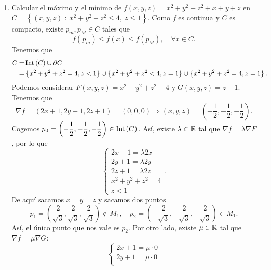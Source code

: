 \begin{eg}
\begin{enumerate}
\[f\left(p_{1}\right)=2\sqrt{5}, \quad f\left(p_{2}\right) = -2\sqrt{5}, \quad f\left(p_{3}\right) = -6, \quad f\left(p_{4}\right)=-6 .\]
Por tanto, el mínimo se alcanza en $\displaystyle p_{3} $ y $\displaystyle p_{4} $ y el máximo se alcanza en $\displaystyle p_{1} $. 
\item Calcular el máximo y el mínimo de $\displaystyle f\left(x,y,z\right) = x^{2} +y^{2} +z^{2} +x + y + z $ en $\displaystyle C = \left\{ \left(x,y,z\right) \; : \; x^{2} +y^{2} + z^{2} \leq 4, \; z \leq 1\right\}  $. Como $\displaystyle f $ es continua y $\displaystyle C $ es compacto, existe $\displaystyle p_{m}, p_{M} \in C $ tales que 
	\[f\left(p_{m}\right) \leq f\left(x\right) \leq f\left(p_{M}\right), \quad \forall x \in C .\]
Tenemos que 
\[
\begin{split}
	C = & \operatorname{Int}\left(C\right) \cup \partial C \\
	= &  \left\{x^{2}+y^{2}+z^{2} = 4 , z < 1\right\} \cup \left\{ x^{2}+y^{2}+z^{2} < 4,  z = 1\right\}  \cup \left\{ x^{2} +y^{2}+z^{2} = 4, z = 1\right\} .
\end{split}
\]
Podemos considerar $\displaystyle F\left(x,y,z\right)=x^{2}+y^{2}+z^{2}-4 $ y $\displaystyle G\left(x,y,z\right) = z-1 $. Tenemos que 
\[\nabla f = \left(2x+1, 2y+1, 2z+1\right) = \left(0,0,0\right) \Rightarrow \left(x,y,z\right) = \left(-\frac{1}{2}, -\frac{1}{2}, -\frac{1}{2}\right) .\]
Cogemos $\displaystyle p_{0} = \left(-\frac{1}{2}, -\frac{1}{2}, -\frac{1}{2}\right) \in \operatorname{Int}\left(C\right) $. Así, existe $\displaystyle \lambda \in \mathbb{R} $ tal que $\displaystyle \nabla f = \lambda \nabla F $, por lo que 
\[
\begin{cases}
2x+1 = \lambda 2x \\
2y+1 = \lambda 2y \\
2z+1 = \lambda 2z \\
x^{2}+y^{2}+z^{2} = 4 \\
z < 1
\end{cases}
.\]
De aquí sacamos $\displaystyle x = y = z $ y sacamos dos puntos
\[p_{1} = \left(\frac{2}{\sqrt{3}}, \frac{2}{\sqrt{3}}, \frac{2}{\sqrt{3}}\right) \not\in M_{1}, \quad p_{2} = \left(-\frac{2}{\sqrt{3}}, -\frac{2}{\sqrt{3}}, -\frac{2}{\sqrt{3}}\right) \in M_{1}.\]
Así, el único punto que nos vale es $\displaystyle p_{2} $. Por otro lado, existe $\displaystyle \mu \in \mathbb{R} $ tal que $\displaystyle \nabla f = \mu \nabla G $:
\[
\begin{cases}
2x+1 = \mu \cdot 0 \\
2y+1 = \mu \cdot 0 \\

\end{cases}\]
\end{enumerate}
\end{eg}
